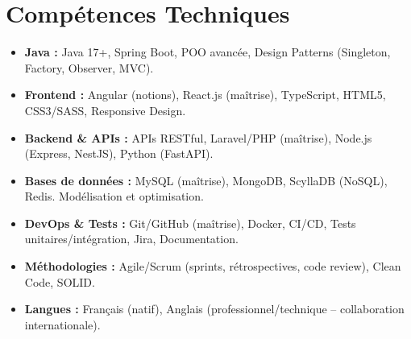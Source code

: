 \documentclass[a4paper,11pt]{article}
\begin{document}
\section{Compétences Techniques}
\begin{itemize}[leftmargin=*, nosep]
    \item \small{\textbf{Java :} Java 17+, Spring Boot, POO avancée, Design Patterns (Singleton, Factory, Observer, MVC).}
    \item \small{\textbf{Frontend :} Angular (notions), React.js (maîtrise), TypeScript, HTML5, CSS3/SASS, Responsive Design.}
    \item \small{\textbf{Backend \& APIs :} APIs RESTful, Laravel/PHP (maîtrise), Node.js (Express, NestJS), Python (FastAPI).}
    \item \small{\textbf{Bases de données :} MySQL (maîtrise), MongoDB, ScyllaDB (NoSQL), Redis. Modélisation et optimisation.}
    \item \small{\textbf{DevOps \& Tests :} Git/GitHub (maîtrise), Docker, CI/CD, Tests unitaires/intégration, Jira, Documentation.}
    \item \small{\textbf{Méthodologies :} Agile/Scrum (sprints, rétrospectives, code review), Clean Code, SOLID.}
    \item \small{\textbf{Langues :} Français (natif), Anglais (professionnel/technique -- collaboration internationale).}
\end{itemize}

\end{document}
